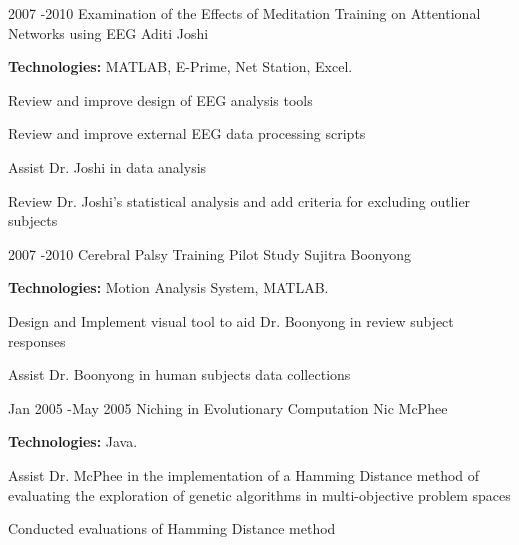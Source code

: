 \documentclass[10pt]{article} %
\begin{document}
\project
{2007 -}{2010}
{ Examination of the Effects of Meditation Training on Attentional Networks using EEG}
{Aditi Joshi}
{\rule{0mm}{5mm}\textbf{Technologies:} MATLAB, E-Prime, Net Station, Excel.

\begin{itemize-noindent}
\item{Review and improve design of EEG analysis tools}
\item{Review and improve external EEG data processing scripts}
\item{Assist Dr. Joshi in data analysis}
\item{Review Dr. Joshi's statistical analysis and add criteria for excluding outlier subjects}
\end{itemize-noindent}

}


\project
{2007 -}{2010}
{Cerebral Palsy Training Pilot Study}
{Sujitra Boonyong}
{\rule{0mm}{5mm}\textbf{Technologies:} Motion Analysis System, MATLAB.

\begin{itemize-noindent}
\item{Design and Implement visual tool to aid Dr. Boonyong in review subject responses}
\item{Assist Dr. Boonyong in human subjects data collections}
\end{itemize-noindent}

}


\project
{Jan 2005 -}{May 2005}
{Niching in Evolutionary Computation}
{Nic McPhee}
{\rule{0mm}{5mm}\textbf{Technologies:} Java.

\begin{itemize-noindent}
\item{Assist Dr. McPhee in the implementation of a Hamming Distance method of evaluating the exploration of genetic algorithms in multi-objective problem spaces}
\item{Conducted evaluations of Hamming Distance method}
\end{itemize-noindent}

}

\end{document}
